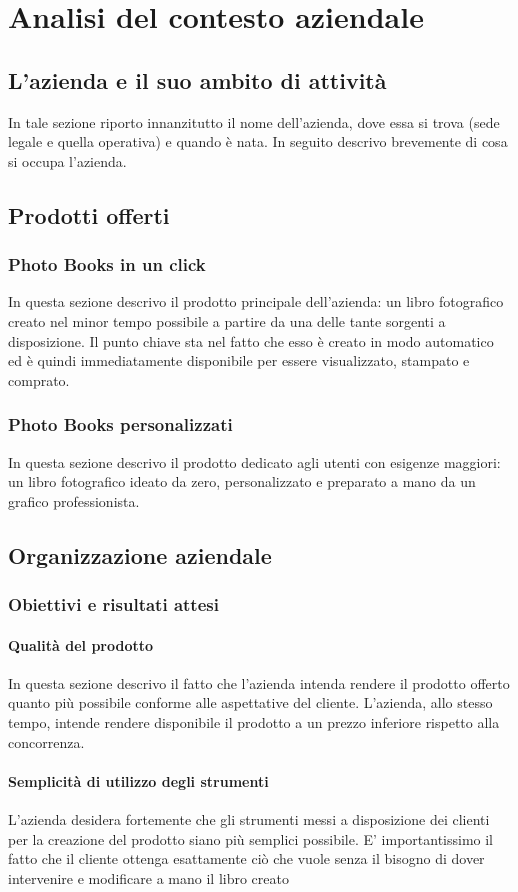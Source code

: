 \chapter{Analisi del contesto aziendale}
	\section{L'azienda e il suo ambito di attività}
		In tale sezione riporto innanzitutto il nome dell'azienda, dove essa si trova (sede legale e quella operativa) e quando è nata. In
		seguito descrivo brevemente di cosa si occupa l'azienda.
	\section{Prodotti offerti}
		\subsection{Photo Books in un click}
			In questa sezione descrivo il prodotto principale dell'azienda: un libro fotografico creato nel minor tempo possibile a
			partire da una delle tante sorgenti a disposizione. Il punto chiave sta nel fatto che esso è creato in modo automatico ed è
			quindi immediatamente disponibile per essere visualizzato, stampato e comprato.
		\subsection{Photo Books personalizzati}
			In questa sezione descrivo il prodotto dedicato agli utenti con esigenze maggiori: un libro fotografico ideato da zero,
			personalizzato e preparato a mano da un grafico professionista.
	\section{Organizzazione aziendale}
		\subsection{Obiettivi e risultati attesi}
			\subsubsection{Qualità del prodotto}
				In questa sezione descrivo il fatto che l'azienda intenda rendere il prodotto offerto quanto più possibile conforme
				alle aspettative del cliente. L'azienda, allo stesso tempo, intende rendere disponibile il prodotto a un prezzo
				inferiore rispetto alla concorrenza.
			\subsubsection{Semplicità di utilizzo degli strumenti}
				L'azienda desidera fortemente che gli strumenti messi a disposizione dei clienti per la creazione del prodotto siano
				più semplici possibile. E' importantissimo il fatto che il cliente ottenga esattamente ciò che vuole senza il bisogno
				di dover intervenire e modificare a mano il libro creato
